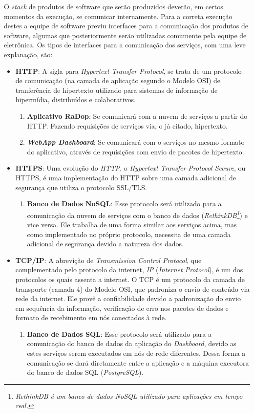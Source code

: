 O \textit{stack} de produtos de software que serão produzidos deverão, em certos momentos da execução, se comunicar internamente. Para a correta execução destes a equipe de software previu interfaces para a comunicação dos produtos de software, algumas que posteriormente serão utilizadas comumente pela equipe de eletrônica.
Os tipos de interfaces para a comunicação dos serviços, com uma leve explanação, são:
\begin{itemize}
    \item \textbf{HTTP}:
    A sigla para \textit{Hypertext Transfer Protocol}, se trata de um protocolo de comunicação (na camada de aplicação segundo o Modelo OSI) de tranferência de hipertexto utilizado para sistemas de informação de hipermídia, distribuídos e colaborativos.
    \begin{enumerate}
        \item \textbf{Aplicativo RaDop}: Se comunicará com a nuvem de serviços a partir do HTTP. Fazendo requisições de serviços via, o já citado, hipertexto.
        \item \textbf{\textit{WebApp Dashboard}}: Se comunicará com o serviços no mesmo formato do aplicativo, através de requisições com envio de pacotes de hipertexto.
    \end{enumerate}
    \item \textbf{HTTPS}:
    Uma evolução do \textit{HTTP}, o \textit{Hypertext Transfer Protocol Secure}, ou HTTPS, é uma implementação do HTTP sobre uma camada adicional de segurança que utiliza o protocolo SSL/TLS.
    \begin{enumerate}
        \item \textbf{Banco de Dados NoSQL}: Esse protocolo será utilizado para a comunicação da nuvem de serviços com o banco de dados (\textit{RethinkDB\footnote{\textit{RethinkDB é um banco de dados \textit{NoSQL} utilizado para aplicações em tempo real.}}}) e vice versa. Ele trabalha de uma forma similar aos serviços acima, mas como implementado no próprio protocolo, necessita de uma camada adicional de segurança devido a natureza dos dados.
    \end{enumerate}
    \item \textbf{TCP/IP}:
    A abrevição de \textit{Transmission Control Protocol}, que complementado pelo protocolo da internet, \textit{IP} (\textit{Internet Protocol}), é um dos protocolos os quais assenta a internet. O TCP é um protocolo da camada de transporte (camada 4) do Modelo OSI, que padroniza o envio de conteúdo via rede da internet. Ele provê a confiabilidade devido a padronização do envio em sequência da informação, verificação de erro nos pacotes de dados e formato de recebimento em nós conectados à rede.
    \begin{enumerate}
        \item \textbf{Banco de Dados SQL}: Esse protocolo será utilizado para a comunicação do banco de dados da aplicação do \textit{Dashboard}, devido as estes serviços serem executados em nós de rede diferentes. Dessa forma a comunicação se dará diretamente entre a aplicação e a máquina executora do banco de dados SQL (\textit{PostgreSQL}).
    \end{enumerate}
\end{itemize}

